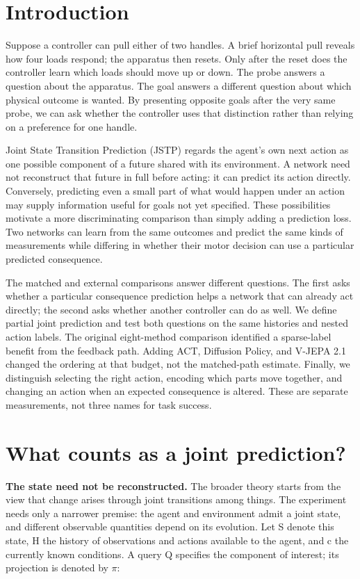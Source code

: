 \documentclass[11pt]{article}
\begin{document}
\FloatBarrier\section{Introduction}

Suppose a controller can pull either of two handles. A brief horizontal pull reveals how four loads respond; the apparatus then resets. Only after the reset does the controller learn which loads should move up or down. The probe answers a question about the apparatus. The goal answers a different question about which physical outcome is wanted. By presenting opposite goals after the very same probe, we can ask whether the controller uses that distinction rather than relying on a preference for one handle.

Joint State Transition Prediction (JSTP) regards the agent's own next action as one possible component of a future shared with its environment. A network need not reconstruct that future in full before acting: it can predict its action directly. Conversely, predicting even a small part of what would happen under an action may supply information useful for goals not yet specified. These possibilities motivate a more discriminating comparison than simply adding a prediction loss. Two networks can learn from the same outcomes and predict the same kinds of measurements while differing in whether their motor decision can use a particular predicted consequence.

The matched and external comparisons answer different questions. The first asks whether a particular consequence prediction helps a network that can already act directly; the second asks whether another controller can do as well. We define partial joint prediction and test both questions on the same histories and nested action labels. The original eight-method comparison identified a sparse-label benefit from the feedback path. Adding ACT, Diffusion Policy, and V-JEPA 2.1 changed the ordering at that budget, not the matched-path estimate. Finally, we distinguish selecting the right action, encoding which parts move together, and changing an action when an expected consequence is altered. These are separate measurements, not three names for task success.

\FloatBarrier\section{What counts as a joint prediction?}

\textbf{The state need not be reconstructed.} The broader theory starts from the view that change arises through joint transitions among things. The experiment needs only a narrower premise: the agent and environment admit a joint state, and different observable quantities depend on its evolution. Let S denote this state, H the history of observations and actions available to the agent, and c the currently known conditions. A query Q specifies the component of interest; its projection is denoted by \ensuremath{\pi}:
\end{document}

